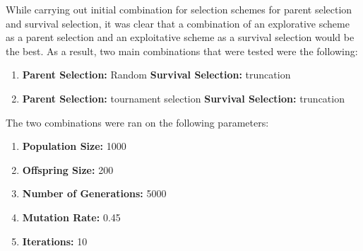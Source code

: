 \documentclass[12pt]{article}
\begin{document}
While carrying out initial combination for selection schemes for parent selection and survival selection, it was clear that a combination of an explorative scheme as a parent selection and an exploitative scheme as a survival selection would be the best. As a result, two main combinations that were tested were the following:

    \begin{enumerate}
        \item \textbf{Parent Selection:} Random \textbf{Survival Selection:} truncation
        \item \textbf{Parent Selection:} tournament selection \textbf{Survival Selection:} truncation
    \end{enumerate}

The two combinations were ran on the following parameters:

    \begin{enumerate}
        \item \textbf{Population Size:} 1000
        \item \textbf{Offspring Size:} 200
        \item \textbf{Number of Generations:} 5000
        \item \textbf{Mutation Rate:} 0.45
        \item \textbf{Iterations:} 10
    \end{enumerate}
\end{document}
